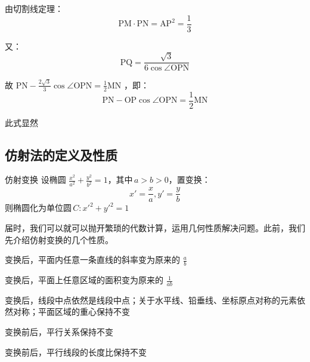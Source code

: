 由切割线定理：
$${\text{PM}}\cdot{\text{PN}}=\text{AP}^2=\frac{1}3$$

又：
$$\text{PQ}=\frac{\sqrt{3}}{6\cos\angle\text{OPN}}$$

故 $\displaystyle{\text{PN}-\frac{2\sqrt{3}}{3}\cos\angle\text{OPN}=\frac{1}{2}\text{MN}}$ ，即：
$$\text{PN}-\text{OP}\cos\angle\text{OPN}=\frac{1}{2}\text{MN}$$

此式显然
\subsection{仿射法的定义及性质}
\begin{definition}{仿射变换}
设椭圆 $\displaystyle{\frac{x^2}{a^2}+\frac{y^2}{b^2}=1}$，其中\,$\displaystyle{a>b>0}$，置变换：
$$x'=\frac{x}{a},y'=\frac{y}{b}$$
则椭圆化为单位圆\,$\displaystyle{C:x'^2+y'^2=1}$
\end{definition}
届时，我们可以就可以抛开繁琐的代数计算，运用几何性质解决问题。此前，我们先介绍仿射变换的几个性质。
\begin{lemma}{}
变换后，平面内任意一条直线的斜率变为原来的 $\displaystyle{\frac{a}{b}}$
\end{lemma}
\begin{lemma}{}
变换后，平面上任意区域的面积变为原来的 $\displaystyle{\frac1{ab}}$
\end{lemma}
\begin{lemma}{}
变换后，线段中点依然是线段中点；关于水平线、铅垂线、坐标原点对称的元素依然对称；平面区域的重心保持不变
\end{lemma}
\begin{lemma}{}
变换前后，平行关系保持不变
\end{lemma}
\begin{lemma}{}
变换前后，平行线段的长度比保持不变
\end{lemma}
